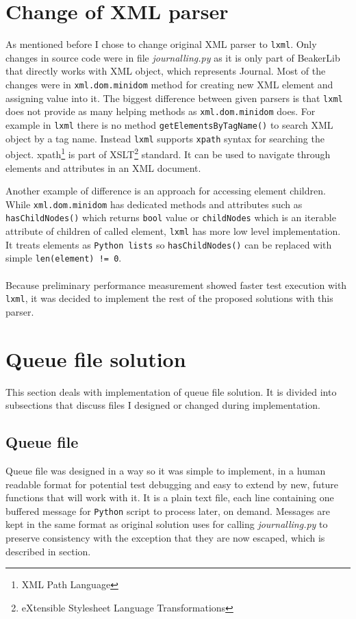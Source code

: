 \section{Change of XML parser}
As mentioned before I chose to change original XML parser to \texttt{lxml}. Only changes in source code were in file \textit{journalling.py} as it is only part of BeakerLib that directly works with XML object, which represents Journal.
Most of the changes were in \texttt{xml.dom.minidom} method for creating new XML element and assigning value into it.
The biggest difference between given parsers is that \texttt{lxml} does not provide as many helping methods as \texttt{xml.dom.minidom} does.
For example in \texttt{lxml}  there is no method \texttt{getElementsByTagName()} to search XML object by a tag name. Instead \texttt{lxml} supports \texttt{xpath}\cite{xpath} syntax for searching the object. xpath\footnote{XML Path Language} is part of XSLT\footnote{eXtensible Stylesheet Language Transformations} standard. It can be used to navigate through elements and attributes in an XML document.

Another example of difference is an approach for accessing element children. While \texttt{xml.dom.minidom} has dedicated methods and attributes such as \texttt{hasChildNodes()} which returns \texttt{bool} value or \texttt{childNodes} which is an iterable attribute of children of called element, \texttt{lxml} has more low level implementation. It treats elements as \texttt{Python lists} so \texttt{hasChildNodes()} can be replaced with simple \texttt{len(element) != 0}.
\\
\\
Because preliminary performance measurement showed faster test execution with \texttt{lxml}, it was decided to implement the rest of the proposed solutions with this parser.

\section{Queue file solution}
This section deals with implementation of queue file solution. It is divided into subsections that discuss files I designed or changed during implementation. 

\subsection{Queue file}
Queue file was designed in a way so it was simple to implement, in a human readable format for potential test debugging and easy to extend by new, future functions that will work with it. 
It is a plain text file, each line containing one buffered message for \texttt{Python} script to process later, on demand. Messages are kept in the same format as original solution uses for calling \textit{journalling.py} to preserve consistency with the exception that they are now escaped, which is described in section.

